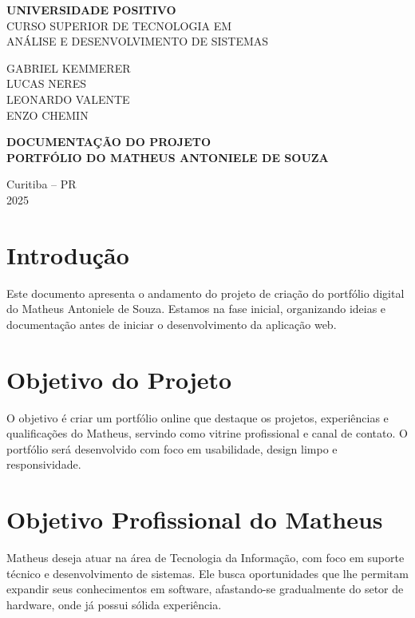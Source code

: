 \documentclass[a4paper,12pt]{article}
\begin{document}
\begin{titlepage}
    \begin{center}
        \large
        \textbf{UNIVERSIDADE POSITIVO}\\[0.5cm]
        CURSO SUPERIOR DE TECNOLOGIA EM\\
        ANÁLISE E DESENVOLVIMENTO DE SISTEMAS

        \vspace{3cm} %

        GABRIEL KEMMERER\\
        LUCAS NERES\\
        LEONARDO VALENTE\\
        ENZO CHEMIN

        \vspace{4cm} %

        \textbf{DOCUMENTAÇÃO DO PROJETO}\\
        \textbf{PORTFÓLIO DO MATHEUS ANTONIELE DE SOUZA}

        \vfill

        Curitiba – PR\\
        2025
    \end{center}
\end{titlepage}

\tableofcontents
\newpage

\section{Introdução}
Este documento apresenta o andamento do projeto de criação do portfólio digital do Matheus Antoniele de Souza. Estamos na fase inicial, organizando ideias e documentação antes de iniciar o desenvolvimento da aplicação web.

\section{Objetivo do Projeto}
O objetivo é criar um portfólio online que destaque os projetos, experiências e qualificações do Matheus, servindo como vitrine profissional e canal de contato. O portfólio será desenvolvido com foco em usabilidade, design limpo e responsividade.

\section{Objetivo Profissional do Matheus}
Matheus deseja atuar na área de Tecnologia da Informação, com foco em suporte técnico e desenvolvimento de sistemas. Ele busca oportunidades que lhe permitam expandir seus conhecimentos em software, afastando-se gradualmente do setor de hardware, onde já possui sólida experiência.
\end{document}
